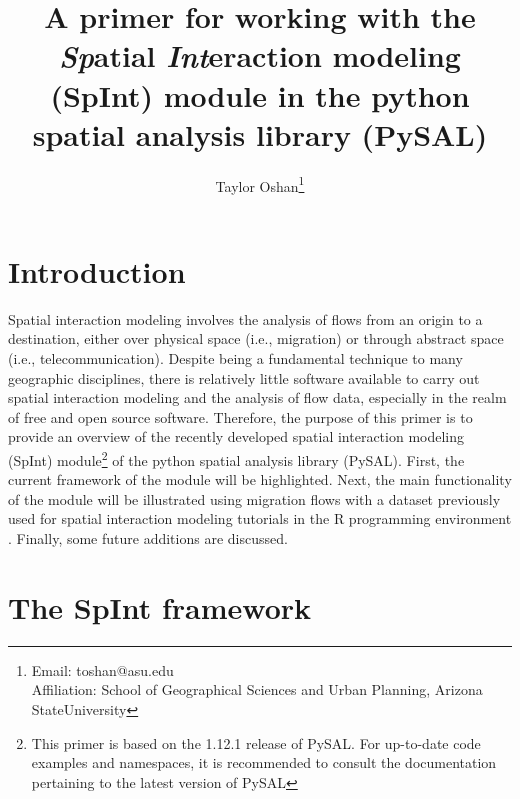 \documentclass[11pt]{article}
\begin{document}
    
    \title{\texorpdfstring{A primer for working with the
\textbf{\emph{Sp}}atial \textbf{\emph{Int}}eraction modeling (SpInt)
module in the python spatial analysis library
(PySAL)}{A primer for working with the Spatial Interaction modeling (SpInt) module in the python spatial analysis library (PySAL)}}\label{a-primer-for-working-with-the-spatial-interaction-modeling-spint-module-in-the-python-spatial-analysis-library-pysal}

\author{Taylor Oshan\thanks{Email: toshan@asu.edu\\
\hspace*{2.0em}Affiliation: School of Geographical Sciences and Urban Planning, Arizona StateUniversity}}

    \maketitle
    




    \section{Introduction}\label{introduction}

    Spatial interaction modeling involves the analysis of flows from an
origin to a destination, either over physical space (i.e., migration) or
through abstract space (i.e., telecommunication). Despite being a
fundamental technique to many geographic disciplines, there is relatively
little software available to carry out spatial interaction modeling and
the analysis of flow data, especially in the realm of free and open source software. Therefore, the purpose of this primer is to
provide an overview of the recently developed spatial interaction
modeling (SpInt) module\footnote{This primer is based on the 1.12.1 release of PySAL. For up-to-date code examples and namespaces, it is recommended to consult the documentation pertaining to the latest version of PySAL} of the python spatial analysis library (PySAL)\footnotemark. First, the current framework of the module will be highlighted. Next,
the main functionality of the module will be illustrated using migration
flows with a dataset previously used for spatial interaction modeling
tutorials in the R programming environment \citep{dennett_estimating_2012}. Finally, some future
additions are discussed.



    \section{The SpInt framework}\label{the-spint-framework}
\end{document}
